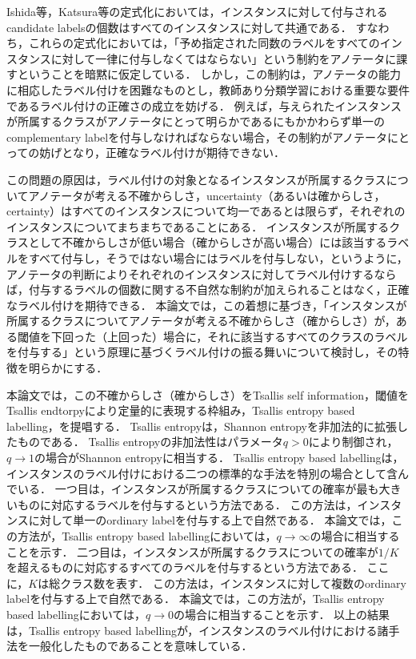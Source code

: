 \documentclass[a4paper,conference]{IEEEtran}
\begin{document}
Ishida等，Katsura等の定式化においては，インスタンスに対して付与されるcandidate labelsの個数はすべてのインスタンスに対して共通である．
すなわち，これらの定式化においては，「予め指定された同数のラベルをすべてのインスタンスに対して一律に付与しなくてはならない」という制約をアノテータに課すということを暗黙に仮定している．
しかし，この制約は，アノテータの能力に相応したラベル付けを困難なものとし，教師あり分類学習における重要な要件であるラベル付けの正確さの成立を妨げる．
例えば，与えられたインスタンスが所属するクラスがアノテータにとって明らかであるにもかかわらず単一のcomplementary labelを付与しなければならない場合，その制約がアノテータにとっての妨げとなり，正確なラベル付けが期待できない．

この問題の原因は，ラベル付けの対象となるインスタンスが所属するクラスについてアノテータが考える不確からしさ，uncertainty（あるいは確からしさ，certainty）はすべてのインスタンスについて均一であるとは限らず，それぞれのインスタンスについてまちまちであることにある．
インスタンスが所属するクラスとして不確からしさが低い場合（確からしさが高い場合）には該当するラベルをすべて付与し，そうではない場合にはラベルを付与しない，というように，アノテータの判断によりそれぞれのインスタンスに対してラベル付けするならば，付与するラベルの個数に関する不自然な制約が加えられることはなく，正確なラベル付けを期待できる．
本論文では，この着想に基づき，「インスタンスが所属するクラスについてアノテータが考える不確からしさ（確からしさ）が，ある閾値を下回った（上回った）場合に，それに該当するすべてのクラスのラベルを付与する」という原理に基づくラベル付けの振る舞いについて検討し，その特徴を明らかにする．

本論文では，この不確からしさ（確からしさ）をTsallis self information，閾値をTsallis endtorpyにより定量的に表現する枠組み，Tsallis entropy based labelling，を提唱する．
Tsallis entropyは，Shannon entropyを非加法的に拡張したものである．
Tsallis entropyの非加法性はパラメータ$q>0$により制御され，$q\rightarrow 1$の場合がShannon entropyに相当する．
Tsallis entropy based labellingは，インスタンスのラベル付けにおける二つの標準的な手法を特別の場合として含んでいる．
一つ目は，インスタンスが所属するクラスについての確率が最も大きいものに対応するラベルを付与するという方法である．
この方法は，インスタンスに対して単一のordinary labelを付与する上で自然である．
本論文では，この方法が，Tsallis entropy based labellingにおいては，$q\rightarrow\infty$の場合に相当することを示す．
二つ目は，インスタンスが所属するクラスについての確率が$1/K$を超えるものに対応するすべてのラベルを付与するという方法である．
ここに，$K$は総クラス数を表す．
この方法は，インスタンスに対して複数のordinary labelを付与する上で自然である．
本論文では，この方法が，Tsallis entropy based labellingにおいては，$q\rightarrow 0$の場合に相当することを示す．
以上の結果は，Tsallis entropy based labellingが，インスタンスのラベル付けにおける諸手法を一般化したものであることを意味している．
\end{document}
